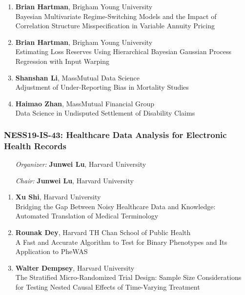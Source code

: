 \begin{enumerate}
\item \textbf{Brian Hartman}, Brigham Young University \\
Bayesian Multivariate Regime-Switching Models and the Impact of Correlation Structure Misspecification in Variable Annuity Pricing
\item \textbf{Brian Hartman}, Brigham Young University \\
Estimating Loss Reserves Using Hierarchical Bayesian Gaussian Process Regression with Input Warping
\item \textbf{Shanshan Li}, MassMutual Data Science \\
Adjustment of Under-Reporting Bias in Mortality Studies
\item \textbf{Haimao Zhan}, MassMutual Financial Group \\
Data Science in Undisputed Settlement of Disability Claims
\end{enumerate}

\subsubsection*{NESS19-IS-43: Healthcare Data Analysis for Electronic Health Records}

\begin{enumerate}[align=left]
\item [\emph{Organizer:}] \textbf{Junwei Lu}, Harvard University \\
\item [\emph{Chair:}] \textbf{Junwei Lu}, Harvard University
\end{enumerate}

\begin{enumerate}
\item \textbf{Xu Shi}, Harvard University \\
Bridging the Gap Between Noisy Healthcare Data and Knowledge: Automated Translation of Medical Terminology
\item \textbf{Rounak Dey}, Harvard TH Chan School of Public Health \\
A Fast and Accurate Algorithm to Test for Binary Phenotypes and Its Application to PheWAS
\item \textbf{Walter Dempsey}, Harvard University \\
The Stratified Micro-Randomized Trial Design:  Sample Size Considerations for Testing Nested Causal Effects of Time-Varying Treatment
\end{enumerate}

